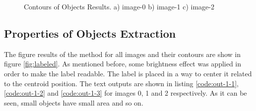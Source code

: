 \documentclass[]{IEEEtran}
\begin{document}
\begin{figure}[]
  \centering
  \caption{Contours of Objects Results. a) image-0 b) image-1 c) image-2}
  \label{fig:contours}
\end{figure}

\subsection{Properties of Objects Extraction}
The figure results of the method for all images and their contours are show in figure \ref{fig:labeled}. As mentioned before, some brightness effect was applied in order to make the label readable. The label is placed in a way to center it related to the centroid position. The text outputs are shown in listing \ref{code:out-1-1}, \ref{code:out-1-2} and \ref{code:out-1-3} for images 0, 1 and 2 respectively. As it can be seen, small objects have small area and so on. 
\end{document}
